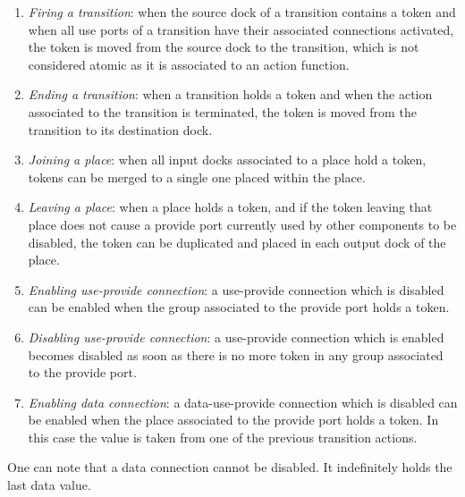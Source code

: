 \begin{enumerate}
\item \emph{Firing a transition}: when the source dock of a transition
  contains a token and when all use ports of a transition have their
  associated connections activated, the token is moved from the source
  dock to the transition, which is not considered atomic as it is
  associated to an action function.
\item \emph{Ending a transition}: when a transition holds a token and
  when the action associated to the transition is terminated, the
  token is moved from the transition to its destination dock.
\item \emph{Joining a place}: when all input docks associated to a
  place hold a token, tokens can be merged to a single one placed
  within the place.
\item \emph{Leaving a place}: when a place holds a token, and if the
  token leaving that place does not cause a provide port currently
  used by other components to be disabled,
  the token can be duplicated and placed in each output dock of the
  place.
\item \emph{Enabling use-provide connection}: a use-provide connection
  which is disabled can be enabled when the group associated to the
  provide port holds a token.
\item \emph{Disabling use-provide connection}: a use-provide
  connection which is enabled becomes disabled as soon as there is no
  more token in any group associated to the provide port.
\item \emph{Enabling data connection}: a data-use-provide connection
  which is disabled can be enabled when the place associated to the
  provide port holds a token. In this case the value is taken from one
  of the previous transition actions.
\end{enumerate}

One can note that a data connection cannot be disabled. It
indefinitely holds the last data value.

